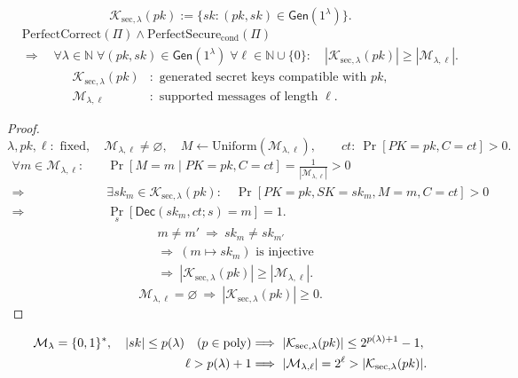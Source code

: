 \documentclass[12pt,a4paper]{article}
\begin{document}
\begin{samepage}
\begin{lemma}
\[
\mathcal{K}_{\mathrm{sec},\lambda}(pk)
:=\{sk:(pk,sk)\in\mathsf{Gen}(1^\lambda)\}.
\]
\[
\begin{aligned}
&\mathrm{PerfectCorrect}(\Pi)\land\mathrm{PerfectSecure}_{\mathrm{cond}}(\Pi)\\
&\Longrightarrow\quad
\forall\lambda\in\mathbb{N}\;
\forall(pk,sk)\in\mathsf{Gen}(1^\lambda)\;
\forall\ell\in\mathbb{N}\cup\{0\}:\quad
|\mathcal{K}_{\mathrm{sec},\lambda}(pk)|\ge|\mathcal{M}_{\lambda,\ell}|.
\end{aligned}
\]
\[
\begin{aligned}
\mathcal{K}_{\mathrm{sec},\lambda}(pk)&:\text{ generated secret keys compatible with }pk,\\
\mathcal{M}_{\lambda,\ell}&:\text{ supported messages of length }\ell.
\end{aligned}
\]
\end{lemma}
\begin{proof}
\[
\lambda,pk,\ell:\text{ fixed},\quad
\mathcal{M}_{\lambda,\ell}\ne\varnothing,\quad
M\leftarrow\mathrm{Uniform}(\mathcal{M}_{\lambda,\ell}),\qquad
ct:\ \Pr[PK=pk,C=ct]>0.
\]
\[
\begin{aligned}
\forall m\in\mathcal{M}_{\lambda,\ell}:\quad
&\Pr[M=m\mid PK=pk,C=ct]=\frac{1}{|\mathcal{M}_{\lambda,\ell}|}>0\\
\Longrightarrow\quad
&\exists sk_m\in\mathcal{K}_{\mathrm{sec},\lambda}(pk):\quad
\Pr[PK=pk,SK=sk_m,M=m,C=ct]>0\\
\Longrightarrow\quad
&\Pr_s[\mathsf{Dec}(sk_m,ct;s)=m]=1.
\end{aligned}
\]
\[
\begin{aligned}
&m\ne m'\ \Longrightarrow\ sk_m\ne sk_{m'}\\
&\Longrightarrow\ (m\mapsto sk_m)\text{ is injective}\\
&\Longrightarrow\ |\mathcal{K}_{\mathrm{sec},\lambda}(pk)|
\ge|\mathcal{M}_{\lambda,\ell}|.
\end{aligned}
\]
\[
\mathcal{M}_{\lambda,\ell}=\varnothing
\ \Longrightarrow\ |\mathcal{K}_{\mathrm{sec},\lambda}(pk)|\ge0.
\]
\end{proof}
\end{samepage}
\[
\begin{aligned}
\mathcal{M}_\lambda=\{0,1\}^{*},\quad
|sk|\le p(\lambda)\quad(p\in\operatorname{poly})
&\Longrightarrow\
|\mathcal{K}_{\mathrm{sec},\lambda}(pk)|\le2^{p(\lambda)+1}-1,\\
\ell>p(\lambda)+1
&\Longrightarrow\
|\mathcal{M}_{\lambda,\ell}|=2^\ell
>|\mathcal{K}_{\mathrm{sec},\lambda}(pk)|.
\end{aligned}
\]
\end{document}
